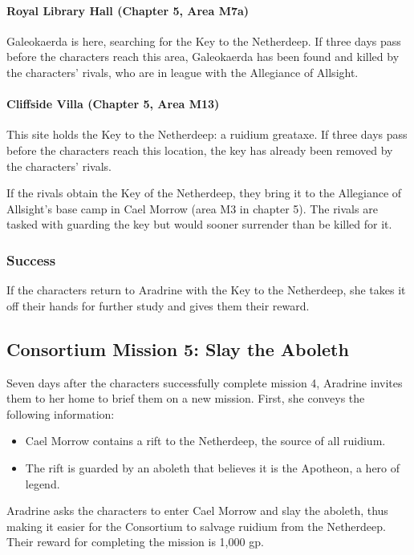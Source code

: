 \documentclass[10pt,a4paper,twoside,twocolumn,openany,nodeprecatedcode]{dndbook}
\begin{document}
\paragraph{Royal Library Hall (Chapter 5, Area M7a)}
Galeokaerda is here, searching for the Key to the Netherdeep. If three days pass before the characters reach this area, Galeokaerda has been found and killed by the characters' rivals, who are in league with the Allegiance of Allsight.

\paragraph{Cliffside Villa (Chapter 5, Area M13)}
This site holds the Key to the Netherdeep: a ruidium greataxe. If three days pass before the characters reach this location, the key has already been removed by the characters' rivals.

If the rivals obtain the Key of the Netherdeep, they bring it to the Allegiance of Allsight's base camp in Cael Morrow (area M3 in chapter 5). The rivals are tasked with guarding the key but would sooner surrender than be killed for it.

\subsubsection{Success}
If the characters return to Aradrine with the Key to the Netherdeep, she takes it off their hands for further study and gives them their reward.

\subsection{Consortium Mission 5: Slay the Aboleth}
Seven days after the characters successfully complete mission 4, Aradrine invites them to her home to brief them on a new mission. First, she conveys the following information:


\begin{itemize}
\item Cael Morrow contains a rift to the Netherdeep, the source of all ruidium.
\item The rift is guarded by an aboleth that believes it is the Apotheon, a hero of legend.
\end{itemize}

Aradrine asks the characters to enter Cael Morrow and slay the aboleth, thus making it easier for the Consortium to salvage ruidium from the Netherdeep. Their reward for completing the mission is 1,000 gp.
\end{document}
